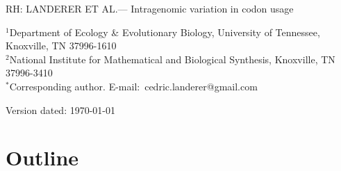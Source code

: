 \documentclass[12pt]{article}
\begin{document}
\doublespacing
\linenumbers



\noindent RH: LANDERER ET AL.--- Intragenomic variation in codon usage
\bigskip
\medskip
\begin{center}

\bigskip





\end{center}

\vfill

{\small
\noindent$^{1}$Department of Ecology \& Evolutionary Biology, University of Tennessee, Knoxville, TN 37996-1610\\
\noindent$^{2}$National Institute for Mathematical and Biological Synthesis, Knoxville, TN 37996-3410\\
\noindent$^{*}$Corresponding author. E-mail:~cedric.landerer@gmail.com
}

\vfill
\centerline{Version dated: \today}
\vfill
\newpage

\begin{abstract}
\end{abstract}	

\section*{Outline}
\end{document}
